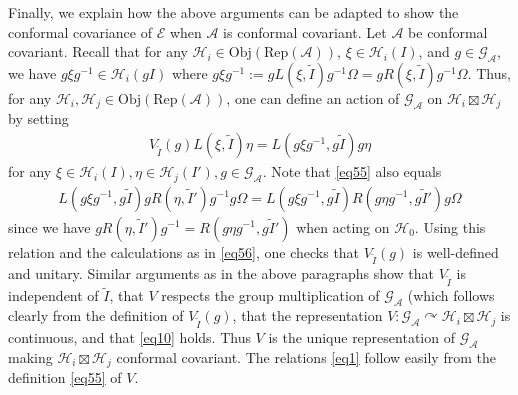 \documentclass[12pt,a4paper]{article}
\theoremstyle{definition}
\theoremstyle{plain}
\newcommand{\mc}{\mathcal}
\newcommand{\wtd}{\widetilde}
\newcommand{\GA}{\mathscr G_{\mathcal A}}
\newcommand{\scr}{\mathscr}
\newcommand{\RepA}{\mathrm{Rep}(\mc A)}
\newcommand{\Obj}{\mathrm{Obj}}
\numberwithin{equation}{section}
\begin{document}
Finally,  we explain how the above arguments can be adapted to show the conformal covariance of $\scr E$ when $\mc A$ is conformal covariant. Let $\mc A$ be conformal covariant.   Recall that for any $\mc H_i\in\Obj(\RepA)$, $\xi\in\mc H_i(I)$, and $g\in\GA$, we have $g\xi g^{-1}\in\mc H_i(gI)$ where $g\xi g^{-1}:=gL(\xi,\wtd I)g^{-1}\Omega=gR(\xi,\wtd I)g^{-1}\Omega$. Thus, for any $\mc H_i,\mc H_j\in\Obj(\RepA)$, one can define an action of $\GA$ on $\mc H_i\boxtimes\mc H_j$ by setting
\begin{align}
V_{\wtd I}(g)L(\xi,\wtd I)\eta=L(g\xi g^{-1},g\wtd I)g\eta\label{eq55}
\end{align}  
for any $\xi\in\mc H_i(I),\eta\in\mc H_j(I'),g\in\GA$. Note that \eqref{eq55} also equals
\begin{align*}
L(g\xi g^{-1},g\wtd I)gR(\eta,\wtd I')g^{-1}g\Omega=L(g\xi g^{-1},g\wtd I)R(g\eta g^{-1},g\wtd I')g\Omega
\end{align*}
since we have $gR(\eta,\wtd I')g^{-1}=R(g\eta g^{-1},g\wtd I')$ when acting on $\mc H_0$. Using this relation and the calculations as in \eqref{eq56}, one checks that $V_{\wtd I}(g)$ is well-defined and unitary.  Similar arguments as in the above paragraphs show that $V_{\wtd I}$ is independent of $\wtd I$, that  $V$ respects the group multiplication of $\GA$ (which follows clearly from the definition of $V_{\wtd I}(g)$, that the representation $V:\GA\curvearrowright\mc H_i\boxtimes\mc H_j$ is continuous, and that \eqref{eq10} holds. Thus $V$ is the unique representation of $\GA$ making $\mc H_i\boxtimes\mc H_j$ conformal covariant. The relations \eqref{eq1} follow easily from the definition \eqref{eq55} of $V$. 






























\printindex

\newpage
\end{document}
